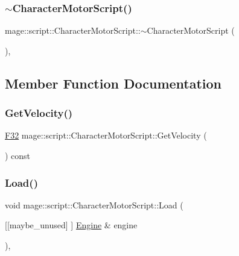 \subsubsection{\texorpdfstring{$\sim$\+Character\+Motor\+Script()}{~CharacterMotorScript()}}
{\footnotesize\ttfamily mage\+::script\+::\+Character\+Motor\+Script\+::$\sim$\+Character\+Motor\+Script (\begin{DoxyParamCaption}{ }\end{DoxyParamCaption})\hspace{0.3cm}{\ttfamily [virtual]}, {\ttfamily [default]}}



\subsection{Member Function Documentation}
\hypertarget{classmage_1_1script_1_1_character_motor_script_a24edb3337af40e7326c424bc6b93c3fa}{}\label{classmage_1_1script_1_1_character_motor_script_a24edb3337af40e7326c424bc6b93c3fa} 
\subsubsection{\texorpdfstring{Get\+Velocity()}{GetVelocity()}}
{\footnotesize\ttfamily \hyperlink{namespacemage_aa97e833b45f06d60a0a9c4fc22ae02c0}{F32} mage\+::script\+::\+Character\+Motor\+Script\+::\+Get\+Velocity (\begin{DoxyParamCaption}{ }\end{DoxyParamCaption}) const\hspace{0.3cm}{\ttfamily [noexcept]}}

\hypertarget{classmage_1_1script_1_1_character_motor_script_a20699adf280bed4bfadd4a89d7df33c1}{}\label{classmage_1_1script_1_1_character_motor_script_a20699adf280bed4bfadd4a89d7df33c1} 
\subsubsection{\texorpdfstring{Load()}{Load()}}
{\footnotesize\ttfamily void mage\+::script\+::\+Character\+Motor\+Script\+::\+Load (\begin{DoxyParamCaption}\item[{\mbox{[}\mbox{[}maybe\+\_\+unused\mbox{]} \mbox{]} \hyperlink{classmage_1_1_engine}{Engine} \&}]{engine }\end{DoxyParamCaption})\hspace{0.3cm}{\ttfamily [override]}, {\ttfamily [virtual]}}

